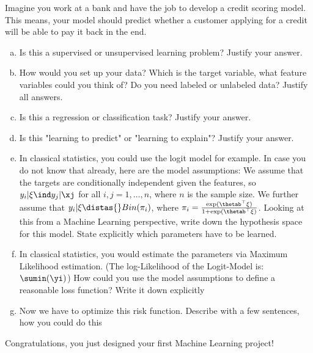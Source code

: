 Imagine you work at a bank and have the job to develop a credit scoring model. This means, your model should predict whether a customer applying for a credit will be able to pay it back in the end.

\begin{enumerate}[a)]

\item Is this a supervised or unsupervised learning problem? Justify your answer.
\item How would you set up your data? Which is the target variable, what feature variables could you think of? Do you need labeled or unlabeled data? Justify all answers.
\item Is this a regression or classification task? Justify your answer.
\item Is this "learning to predict" or "learning to explain"? Justify your answer.
\item In classical statistics, you could use the logit model for example. In case you do not know that already, here are the model assumptions: We assume that the targets are conditionally independent given the features, so $y_i|\xi \ind y_j|\xj$ for all $i,j = 1, \dots, n$, where $n$ is the sample size. We further assume that $y_i|\xi \distas{} Bin(\pi_i)$, where $\pi_i = \frac{\exp(\thetab^\top\xi)}{1+\exp(\thetab^\top\xi)}$.
Looking at this from a Machine Learning perspective, write down the hypothesis space for this model. State explicitly which parameters have to be learned.
\item In classical statistics, you would estimate the parameters via Maximum Likelihood estimation. (The log-Likelihood of the Logit-Model is: $\sumin(\yi)$) How could you use the model assumptions to define a reasonable loss function? Write it down explicitly
\item Now we have to optimize this risk function. Describe with a few sentences, how you could do this

\end{enumerate}

Congratulations, you just designed your first Machine Learning project!
